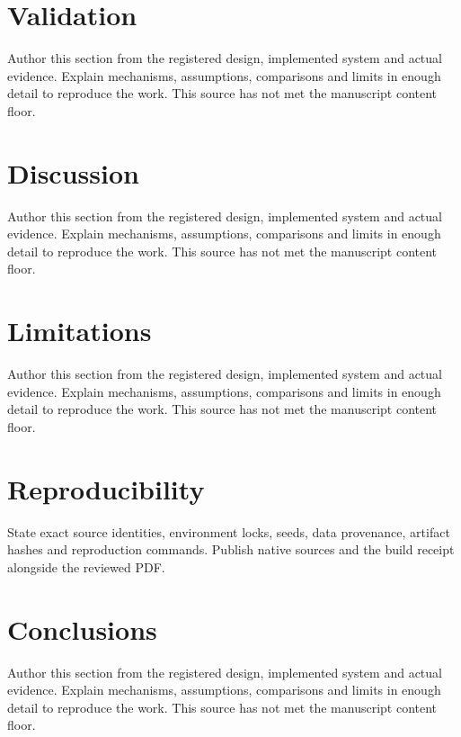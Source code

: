\documentclass[11pt]{article}
\begin{document}
\section{Validation}\label{sec:validation}
Author this section from the registered design, implemented system and actual evidence. Explain mechanisms, assumptions, comparisons and limits in enough detail to reproduce the work. This source has not met the manuscript content floor.

\section{Discussion}\label{sec:discussion}
Author this section from the registered design, implemented system and actual evidence. Explain mechanisms, assumptions, comparisons and limits in enough detail to reproduce the work. This source has not met the manuscript content floor.

\section{Limitations}\label{sec:limitations}
Author this section from the registered design, implemented system and actual evidence. Explain mechanisms, assumptions, comparisons and limits in enough detail to reproduce the work. This source has not met the manuscript content floor.

\section{Reproducibility}\label{sec:reproducibility}
State exact source identities, environment locks, seeds, data provenance, artifact hashes and reproduction commands. Publish native sources and the build receipt alongside the reviewed PDF.

\section{Conclusions}\label{sec:conclusions}
Author this section from the registered design, implemented system and actual evidence. Explain mechanisms, assumptions, comparisons and limits in enough detail to reproduce the work. This source has not met the manuscript content floor.

% 
% 
\end{document}
